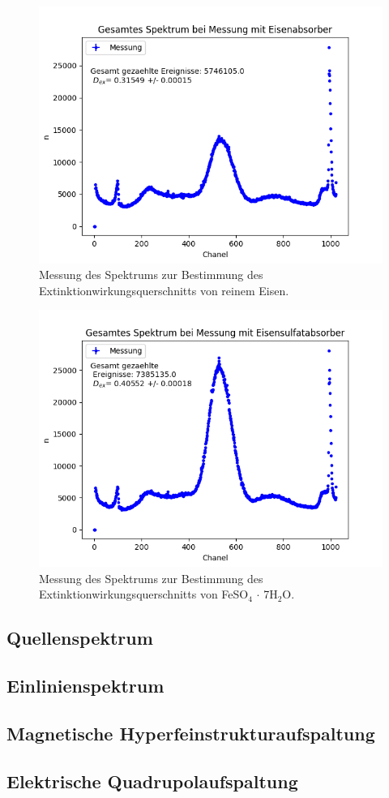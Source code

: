 \documentclass[12pt,a4paper]{article}
\begin{document}
\begin{figure} [H]
\centering
\includegraphics[scale=0.8]{Bilder/Extinktion/Eisen.png}
\caption{Messung des Spektrums zur Bestimmung des Extinktionwirkungsquerschnitts von reinem Eisen.}
\end{figure}

\begin{figure} [H]
\centering
\includegraphics[scale=0.8]{Bilder/Extinktion/Eisensulfat.png}
\caption{Messung des Spektrums zur Bestimmung des Extinktionwirkungsquerschnitts von FeSO$_4$ $\cdot$ 7H$_2$O.}
\end{figure}

\subsection{Quellenspektrum}
\subsection{Einlinienspektrum}
\subsection{Magnetische Hyperfeinstrukturaufspaltung}
\subsection{Elektrische Quadrupolaufspaltung}
\end{document}

